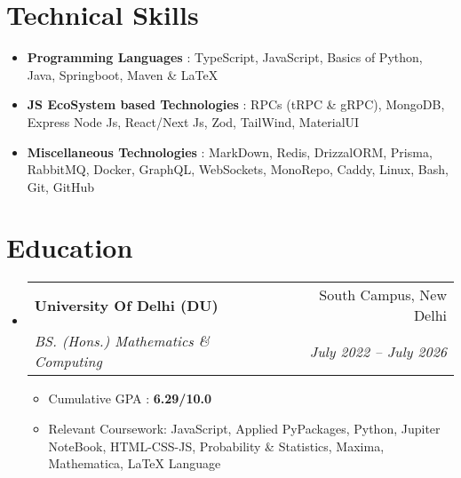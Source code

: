 \documentclass[letterpaper,11pt]{article}
\makeatletter
\newcommand{\resumeItem}[1]{
  \item\small{
    {#1 \vspace{-2pt}}
  }
}
\newcommand{\resumeSubheading}[4]{
  \vspace{-2pt}\item
    \begin{tabular*}{0.97\textwidth}[t]{l@{\extracolsep{\fill}}r}
      \textbf{#1} & #2 \\
      \textit{\small#3} & \textit{\small #4} \\
    \end{tabular*}\vspace{-7pt}
}
\newcommand{\resumeSubHeadingListStart}{\begin{itemize}[leftmargin=0.15in, label={}]}
\newcommand{\resumeSubHeadingListEnd}{\end{itemize}}
\newcommand{\resumeItemListStart}{\begin{itemize}}
\newcommand{\resumeItemListEnd}{\end{itemize}\vspace{-5pt}}
\makeatother
\begin{document}
%
\section{Technical Skills}
\resumeItemListStart
            \resumeItem{\textbf{Programming Languages }{: TypeScript, JavaScript, Basics of Python, Java, Springboot, Maven \& LaTeX}}
            \resumeItem{\textbf{JS EcoSystem based Technologies }{: RPCs (tRPC \& gRPC),  MongoDB, Express Node Js, React/Next Js, Zod, TailWind, MaterialUI}}
            \resumeItem{\textbf{Miscellaneous Technologies }{: MarkDown, Redis, DrizzalORM, Prisma, RabbitMQ, Docker, GraphQL, WebSockets, MonoRepo, Caddy, Linux, Bash, Git, GitHub}}
\resumeItemListEnd





\section{Education}
  \resumeSubHeadingListStart
    \resumeSubheading
      {University Of Delhi (DU)}{ South Campus, New Delhi}
      {BS. (Hons.) Mathematics \& Computing}{July 2022 -- July 2026}
      \resumeItemListStart
        \resumeItem{Cumulative GPA : \textbf{6.29/10.0}}
        \resumeItem{Relevant Coursework: JavaScript, Applied PyPackages, Python, Jupiter NoteBook, HTML-CSS-JS, Probability \& Statistics, Maxima, Mathematica, LaTeX Language}
      \resumeItemListEnd
  \resumeSubHeadingListEnd





\begin{comment}
    {\emph{Research Work} $|$ {Jan 2021 - July 2022}}
    {\emph{Natural Language Processing} $|$ {Feb 2021 - May 2021}}
\end{comment}

\end{document}
